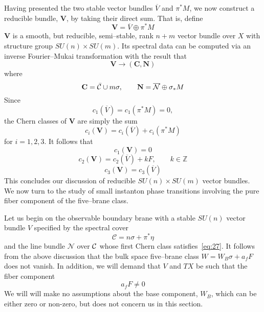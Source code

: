 \documentclass[a4paper,12pt]{article}
\numberwithin{equation}{section}
\newcommand{\bC}{{\mathbf C}}
\newcommand{\bN}{{\mathbf N}}
\newcommand{\bV}{{\mathbf V}}
\def\cC{{\mathcal C}}
\def\cN{{\mathcal N}}
\theoremstyle{plain}
\begin{document}
Having presented the two stable vector bundles $\overline{V}$ and
$\pi^{*}M$, 
we now construct a reducible bundle, $\bV$, by taking their
direct sum.  That
is, define
\begin{equation}
\bV= \overline{V} \oplus \pi^{*}M
\label{eq:135}
\end{equation}
$\bV$ is a smooth, but reducible, semi--stable, 
 rank $n+m$ vector bundle over $X$ with
structure group $SU(n)\times SU(m)$. Its spectral data can be computed via an
inverse Fourier--Mukai transformation with the result that
\begin{equation}
\bV \longrightarrow (\bC, \bN)
\label{eq:136}
\end{equation}
where
\begin{equation}
\bC =\bar{\cal{C}}\cup m\sigma, \qquad 
\bN =\overline{\cN}\oplus \sigma_{*}M
\label{eq:137}
\end{equation}
Since
\begin{equation}
c_{1}(\overline{V})=c_{1}(\pi^{*}M)=0,
\label{eq:138}
\end{equation}
the Chern classes of $\bV$ are simply the sum
\begin{equation}
c_{i}(\bV)=c_{i}(\overline{V}) +c_{i}(\pi^{*}M)
\label{eq:139}
\end{equation}
for $i=1,2,3$. It follows that 
\begin{equation}
c_{1}(\bV)=0
\label{eq:140}
\end{equation}
\begin{equation}
c_{2}(\bV)=c_{2}(\overline{V}) +kF, \qquad k\in {\mathbb Z}
\label{eq:141}
\end{equation}
\begin{equation}
c_{3}(\bV)=c_{3}(\overline{V})
\label{eq:142}
\end{equation}
This concludes our discussion of reducible $SU(n)\times SU(m)$ vector
bundles. We now turn to the study of small instanton phase transitions
involving 
the pure fiber component of the five--brane class.


Let us begin on the observable boundary brane 
with a stable $SU(n)$ vector bundle $V$ specified by the
spectral cover
\begin{equation}
\cC = n\sigma + \pi^{*}\eta
\label{eq:143}
\end{equation}
and the line bundle $\cN$ over ${\cal{C}}$ whose first Chern class
satisfies~\eqref{eq:27}. It follows from the above discussion that the bulk
space five--brane class $W=W_{B}\sigma+a_{f}F$ does not vanish. In addition,
we will demand that $V$ and $TX$ be such that the fiber component
\begin{equation}
a_{f}F \neq 0
\label{eq:144}
\end{equation}
We will will make no assumptions about the base component, $W_{B}$,
which can be either zero or non-zero, but does not concern us in this section. 
\end{document}
